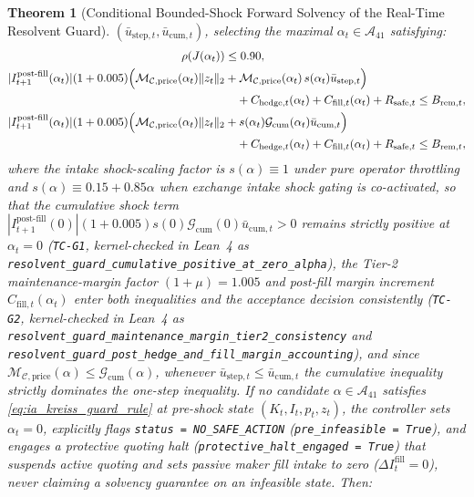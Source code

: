 \documentclass[12pt]{article}
\newtheorem{theorem}{Theorem}[section]
\theoremstyle{definition}
\theoremstyle{remark}
\begin{document}
\begin{theorem}[Conditional Bounded-Shock Forward Solvency of the Real-Time Resolvent Guard]
$(\bar{u}_{\mathrm{step},t}, \bar{u}_{\mathrm{cum},t})$, selecting the maximal $\alpha_t \in \mathcal{A}_{41}$ satisfying:
\begin{equation}
\begin{aligned}
\rho(J(\alpha_t)) &\le 0.90, \\
|I_{t+1}^{\mathrm{post\text{-}fill}}(\alpha_t)| (1 + 0.005) \Bigl( \mathcal{M}_{\mathcal{C},\mathrm{price}}(\alpha_t)\|z_t\|_2 &+ \mathcal{M}_{\mathcal{C},\mathrm{price}}(\alpha_t)\, s(\alpha_t)\bar{u}_{\mathrm{step},t} \Bigr) \\
&\quad + C_{\mathrm{hedge},t}(\alpha_t) + C_{\mathrm{fill},t}(\alpha_t) + R_{\mathrm{safe},t} \le B_{\mathrm{rem},t}, \\
|I_{t+1}^{\mathrm{post\text{-}fill}}(\alpha_t)| (1 + 0.005) \Bigl( \mathcal{M}_{\mathcal{C},\mathrm{price}}(\alpha_t)\|z_t\|_2 &+ s(\alpha_t)\mathcal{G}_{\mathrm{cum}}(\alpha_t)\bar{u}_{\mathrm{cum},t} \Bigr) \\
&\quad + C_{\mathrm{hedge},t}(\alpha_t) + C_{\mathrm{fill},t}(\alpha_t) + R_{\mathrm{safe},t} \le B_{\mathrm{rem},t},
\end{aligned}
\label{eq:ia_kreiss_guard_rule}
\end{equation}
where the intake shock-scaling factor is $s(\alpha) \equiv 1$ under pure operator throttling and $s(\alpha) \equiv 0.15 + 0.85\alpha$ when exchange intake shock gating is co-activated, so that the cumulative shock term $|I_{t+1}^{\mathrm{post\text{-}fill}}(0)|(1+0.005)s(0)\mathcal{G}_{\mathrm{cum}}(0)\bar{u}_{\mathrm{cum},t} > 0$ remains strictly positive at $\alpha_t = 0$ (\texttt{TC-G1}, kernel-checked in Lean~4 as \nolinkurl{resolvent_guard_cumulative_positive_at_zero_alpha}), the Tier-2 maintenance-margin factor $(1 + \mu) = 1.005$ and post-fill margin increment $C_{\mathrm{fill},t}(\alpha_t)$ enter both inequalities and the acceptance decision consistently (\texttt{TC-G2}, kernel-checked in Lean~4 as \nolinkurl{resolvent_guard_maintenance_margin_tier2_consistency} and \nolinkurl{resolvent_guard_post_hedge_and_fill_margin_accounting}), and since $\mathcal{M}_{\mathcal{C},\mathrm{price}}(\alpha) \le \mathcal{G}_{\mathrm{cum}}(\alpha)$, whenever $\bar{u}_{\mathrm{step},t} \le \bar{u}_{\mathrm{cum},t}$ the cumulative inequality strictly dominates the one-step inequality. If no candidate $\alpha \in \mathcal{A}_{41}$ satisfies \eqref{eq:ia_kreiss_guard_rule} at pre-shock state $(K_t, I_t, p_t, z_t)$, the controller sets $\alpha_t = 0$, explicitly flags \texttt{status = NO\_SAFE\_ACTION} (\texttt{pre\_infeasible = True}), and engages a protective quoting halt (\texttt{protective\_halt\_engaged = True}) that suspends active quoting and sets passive maker fill intake to zero ($\Delta I^{\mathrm{fill}}_t = 0$), never claiming a solvency guarantee on an infeasible state. Then:

\end{theorem}
\end{document}
